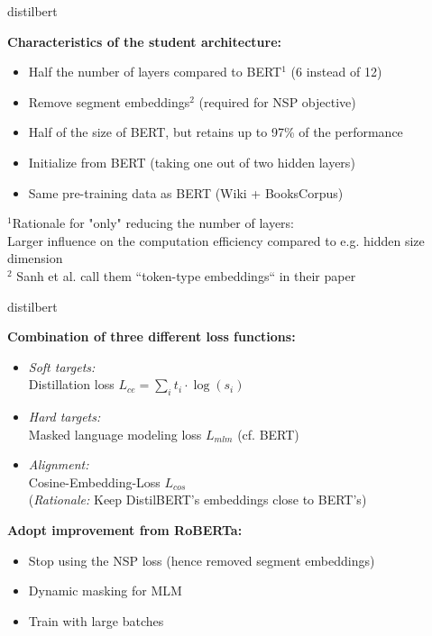 
\begin{frame}{distilbert}

\vfill

\textbf{Characteristics of the student architecture:}

\begin{itemize}
	\item Half the number of layers compared to BERT$^1$ (6 instead of 12)
	\item Remove segment embeddings$^2$ (required for NSP objective)
 	\item Half of the size of BERT, but retains up to 97\% of the performance
	\item Initialize from BERT (taking one out of two hidden layers)
	\item Same pre-training data as BERT (Wiki + BooksCorpus)
\end{itemize}

\vfill

{\footnotesize $^1$Rationale for "only" reducing the number of layers:\\
Larger influence on the computation efficiency compared to e.g. hidden size dimension\\
$^2$ Sanh et al. call them ``token-type embeddings`` in their paper}

\end{frame}


\begin{frame}{distilbert}

\vfill

\textbf{Combination of three different loss functions:}

\begin{itemize}
	\item \textit{Soft targets:}\\Distillation loss $L_{ce} = \sum_i t_i \cdot \log(s_i)$
	\item \textit{Hard targets:}\\Masked language modeling loss $L_{mlm}$ (cf. BERT)
	\item \textit{Alignment:}\\Cosine-Embedding-Loss $L_{cos}$\\
				(\textit{Rationale:} Keep DistilBERT's embeddings close to BERT's)
\end{itemize}

\vspace{.3cm}

\textbf{Adopt improvement from RoBERTa:}

\begin{itemize}
	\item Stop using the NSP loss (hence removed segment embeddings)
	\item Dynamic masking for MLM
	\item Train with large batches
\end{itemize}

\vfill

\end{frame}

